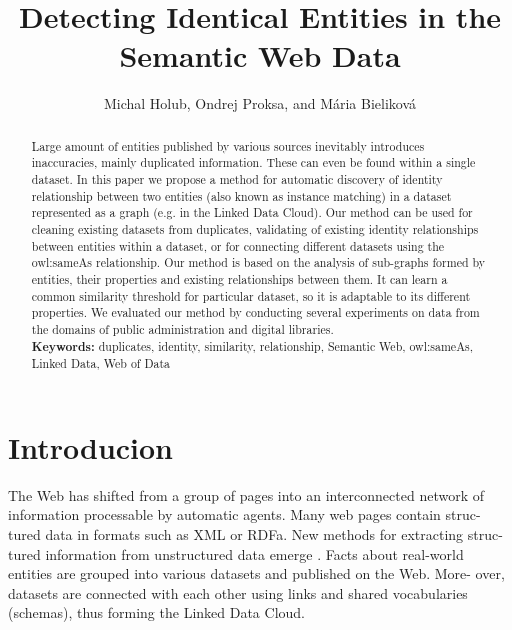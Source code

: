 \documentclass{llncs}
\begin{document}
\title{Detecting Identical Entities in the Semantic Web Data}

\author{Michal Holub, Ondrej Proksa, and Mária Bieliková}


\maketitle            

\begin{abstract}
Large amount of entities published by various sources inevitably
introduces inaccuracies, mainly duplicated information. These
can even be found within a single dataset. In this paper we propose
a method for automatic discovery of identity relationship between two
entities (also known as instance matching) in a dataset represented as
a graph (e.g. in the Linked Data Cloud). Our method can be used for
cleaning existing datasets from duplicates, validating of existing identity
relationships between entities within a dataset, or for connecting different
datasets using the owl:sameAs relationship. Our method is based on the
analysis of sub-graphs formed by entities, their properties and existing
relationships between them. It can learn a common similarity threshold
for particular dataset, so it is adaptable to its different properties. We
evaluated our method by conducting several experiments on data from
the domains of public administration and digital libraries.
\vspace{5mm} \\
\textbf {Keywords:} duplicates, identity, similarity, relationship, Semantic Web,
owl:sameAs, Linked Data, Web of Data
\end{abstract}

\section{Introducion}

The Web has shifted from a group of pages into an interconnected network of
information processable by automatic agents. Many web pages contain struc-
tured data in formats such as XML or RDFa. New methods for extracting struc-
tured information from unstructured data emerge \cite{auer2007dbpedia,suchanek2007yago}. Facts about real-world
entities are grouped into various datasets and published on the Web. More-
over, datasets are connected with each other using links and shared vocabularies
(schemas), thus forming the Linked Data Cloud.
\end{document}
